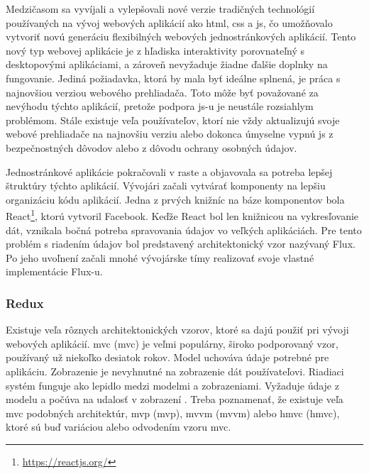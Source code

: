 Medzičasom sa vyvíjali a vylepšovali nové verzie tradičných technológií používaných
na vývoj webových aplikácií ako \acrshort{html}, \acrshort{css} a \acrshort{js}, čo umožňovalo vytvoriť
novú generáciu flexibilných webových jednostránkových aplikácií. Tento nový typ webovej
aplikácie je z hľadiska interaktivity porovnateľný s desktopovými aplikáciami, a zároveň
nevyžaduje žiadne ďalšie doplnky na fungovanie. Jediná požiadavka, ktorá by mala byť
ideálne splnená, je práca s najnovšiou verziou webového prehliadača. Toto môže byť
považované za nevýhodu týchto aplikácií, pretože podpora \acrlong{js}-u je neustále
rozsiahlym problémom. Stále existuje veľa používateľov, ktorí nie vždy aktualizujú svoje
webové prehliadače na najnovšiu verziu alebo dokonca úmyselne vypnú \acrshort{js}
z bezpečnostných dôvodov alebo z dôvodu ochrany osobných údajov.

Jednostránkové aplikácie pokračovali v raste a objavovala sa potreba lepšej štruktúry
týchto aplikácií. Vývojári začali vytvárať komponenty na lepšiu organizáciu kódu aplikácií.
Jedna z prvých knižníc na báze komponentov bola React\footnote{\url{https://reactjs.org/}}, ktorú vytvoril Facebook.
Keďže React bol len knižnicou na vykresľovanie dát, vznikala bočná potreba spravovania
údajov vo veľkých aplikáciách. Pre tento problém s riadením údajov bol predstavený
architektonický vzor nazývaný Flux. Po jeho uvoľnení začali mnohé vývojárske tímy
realizovať svoje vlastné implementácie Flux-u.

\subsubsection{Redux}
\label{subsubsec:redux}

Existuje veľa rôznych architektonických vzorov, ktoré sa dajú použiť pri vývoji
webových aplikácií. \acrshort{mvc} (\acrlong{mvc}) je veľmi populárny, široko
podporovaný vzor, používaný už niekoľko desiatok rokov.
Model uchováva údaje potrebné pre aplikáciu. Zobrazenie je nevyhnutné na zobrazenie
dát používateľovi. Riadiaci systém funguje ako lepidlo medzi modelmi a zobrazeniami.
Vyžaduje údaje z modelu a počúva na udalosť v zobrazení \cite{maccaw}.
Treba poznamenať, že existuje veľa \acrshort{mvc} podobných architektúr, \acrshort{mvp} (\acrlong{mvp}),
\acrshort{mvvm} (\acrlong{mvvm}) alebo \acrshort{hmvc} (\acrlong{hmvc}),
ktoré sú buď variáciou alebo odvodením vzoru \acrshort{mvc}.

